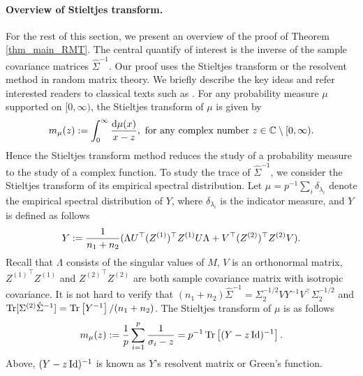 \paragraph{Overview of Stieltjes transform.}
For the rest of this section, we present an overview of the proof of Theorem \ref{thm_main_RMT}.
The central quantify of interest is the inverse of the sample covariance matrices $\hat{\Sigma}^{-1}$.
Our proof uses the Stieltjes transform or the resolvent method in random matrix theory.
We briefly describe the key ideas and refer interested readers to classical texts such as  \citet{bai2009spectral,tao2012topics,erdos2017dynamical}.
For any probability measure $\mu$ supported on $[0,\infty)$, the Stieltjes transform of $\mu$ is given by
$$m_\mu(z):= \int_0^\infty \frac{\mathrm{d}\mu(x)}{x-z}, \text{ for any complex number } z\in \mathbb{C}\setminus [0,\infty).$$
Hence the Stieltjes transform method reduces the study of a probability measure to the study of a complex function.
To study the trace of $\hat{\Sigma}^{-1}$, we consider the Stieltjes transform of its empirical spectral distribution.
Let $\mu=p^{-1}\sum_{i} \delta_{\lambda_i}$ denote the empirical spectral distribution of $Y$, where $\delta_{\lambda_i}$ is the indicator measure, and $Y$ is defined as follows
\begin{align}\label{eigen2extra}
	Y := \frac{1}{n_1 + n_2}(\Lambda U^\top (Z^{(1)})^\top Z^{(1)} U\Lambda  + V^\top (Z^{(2)})^\top Z^{(2)}V).
\end{align}
Recall that $\Lambda$ consists of the singular values of $M$, $V$ is an orthonormal matrix, ${Z^{(1)}}^{\top} Z^{(1)}$ and ${Z^{(2)}}^{\top} Z^{(2)}$ are both sample covariance matrix with isotropic covariance.
It is not hard to verify that $(n_1 + n_2)\hat{\Sigma}^{-1}= \Sigma_2^{-1/2} VY^{-1}V^\top \Sigma_2^{-1/2}$ and $\operatorname{Tr}[\Sigma^{(2)} \hat{\Sigma}^{-1}] = \operatorname{Tr}\left[Y^{-1}\right] / (n_1 + n_2)$.
The Stieltjes transform of $\mu$ is as follows
 \[ m_{\mu}(z) := \frac{1}{p}\sum_{i=1}^p \frac{1}{\sigma_i - z}= p^{-1}\operatorname{Tr}\left[(Y-z\operatorname{Id})^{-1}\right]. \]
Above, $(Y - z\operatorname{Id})^{-1}$ is known as $Y$'s resolvent matrix or Green's function.
